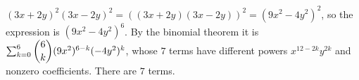 $(3x+2y)^2(3x-2y)^2=\left((3x+2y)(3x-2y)\right)^2=(9x^2-4y^2)^2$, so the expression is $(9x^2-4y^2)^6$. By the binomial theorem it is $\sum_{k=0}^{6}\dbinom6k(9x^2)^{6-k}(-4y^2)^k$, whose $7$ terms have different powers $x^{12-2k}y^{2k}$ and nonzero coefficients. There are $\boxed{7}$ terms.
